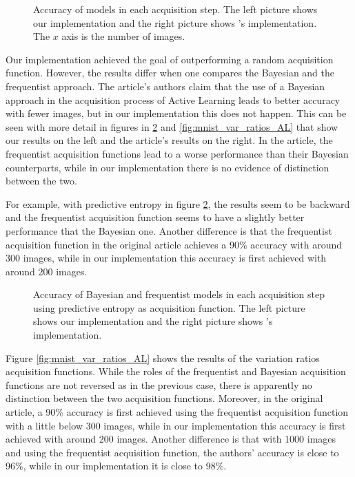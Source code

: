 \begin{figure}[H]
    \centering
    \hfill
    \caption{Accuracy of models in each acquisition step. The left picture shows our implementation and the right picture shows \citeauthor{Gal2016Active}'s implementation. The $x$ axis is the number of images.}
    \label{fig:mnist_comparison_active_learning_random}
\end{figure}

Our implementation achieved the goal of outperforming a random acquisition function. However, the results differ when one compares the Bayesian and the frequentist approach. The article's authors claim that the use of a Bayesian approach in the acquisition process of Active Learning leads to better accuracy with fewer images, but in our implementation this does not happen. This can be seen with more detail in figures in \ref{fig:mnist_pred_entropy_AL} and \ref{fig:mnist_var_ratios_AL} that show our results on the left and the article's results on the right. In the article, the frequentist acquisition functions lead to a worse performance than their Bayesian counterparts, while in our implementation there is no evidence of distinction between the two.

For example, with predictive entropy in figure \ref{fig:mnist_pred_entropy_AL}, the results seem to be backward and the frequentist acquisition function seems to have a slightly better performance that the Bayesian one. Another difference is that the frequentist acquisition function in the original article achieves a 90\% accuracy with around 300 images, while in our implementation this accuracy is first achieved with around 200 images.

\begin{figure}[H]
  \centering
  \hfill
  \caption{Accuracy of Bayesian and frequentist models in each acquisition step using predictive entropy as acquisition function. The left picture shows our implementation and the right picture shows \citeauthor{Gal2016Active}'s implementation.}
  \label{fig:mnist_pred_entropy_AL}
\end{figure}

Figure \ref{fig:mnist_var_ratios_AL} shows the results of the variation ratios acquisition functions. While the roles of the frequentist and Bayesian acquisition functions are not reversed as in the previous case, there is apparently no distinction between the two acquisition functions. Moreover, in the original article, a 90\% accuracy is first achieved using the frequentist acquisition function with a little below 300 images, while in our implementation this accuracy is first achieved with around 200 images. Another difference is that with 1000 images and using the frequentist acquisition function, the authors' accuracy is close to 96\%, while in our implementation it is close to 98\%.

